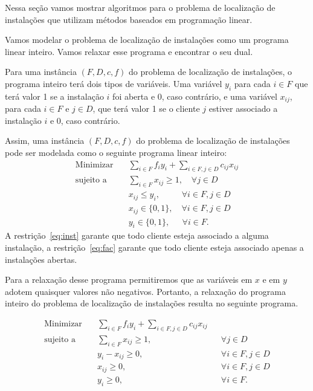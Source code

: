 Nessa seção vamos mostrar algoritmos para o problema de localização de instalações que utilizam métodos baseados em programação linear.

Vamos modelar o problema de localização de instalações como um programa linear inteiro. Vamos relaxar esse programa e encontrar o seu dual.

Para uma instância $(F,D,c,f)$ do problema de localização de instalações, o programa inteiro terá dois tipos de variáveis. Uma variável $y_i$ para cada $i \in F$ que terá valor 1 se a instalação $i$ foi aberta e 0, caso contrário, e uma variável $x_{ij}$, para cada $i \in F$ e $j \in D$, que terá valor 1 se o cliente $j$ estiver associado a instalação $i$ e 0, caso contrário. 

Assim, uma instância $(F,D,c,f)$ do problema de localização de instalações pode ser modelada como o seguinte programa linear inteiro:
\begin{align}
 \text{Minimizar} \quad & \sum_{i \in F}f_iy_i + \sum_{i\in F,j\in D}c_{ij}x_{ij} \nonumber \\
 \text{sujeito a} \quad & \sum_{i\in F} x_{ij}\geq1, \quad \forall j \in D \label{eq:inst}\\
 &x_{ij} \leq y_i,\quad \quad \; \; \forall i\in F,j\in D \label{eq:fac} \\
 &x_{ij} \in \{0,1\} ,\quad \forall i\in F,j\in D \label{fl:x}\\
 &y_i \in \{0,1\}, \quad \; \,\forall i\in F \label{fl:y}.
\end{align}
A restrição~\eqref{eq:inst} garante que todo cliente esteja associado a alguma instalação, a restrição~\eqref{eq:fac} garante que todo cliente esteja associado apenas a instalações abertas.

Para a relaxação desse programa permitiremos que as variáveis em $x$ e em $y$ adotem quaisquer valores não negativos. Portanto, a relaxação do programa inteiro do problema de localização de instalações resulta no seguinte programa.

    \begin{align}
        \text{Minimizar} \quad & \sum_{i \in F}f_iy_i + \sum_{i\in F,j\in D}c_{ij}x_{ij} \tag{PL} \label{P1}\\
        \text{sujeito a} \quad & \sum_{i\in F} x_{ij}\geq1,  &&\forall j \in D \tag{P2} \label{P2}\\
        &y_i - x_{ij} \geq 0, &&\forall i\in F,j\in D \tag{P3} \label{P3}\\
        &x_{ij} \geq 0, &&\forall i\in F,j\in D\tag{P4}\label{P4}\\
        &y_i \geq 0, &&\forall i\in F. \tag{P5} \label{P5}
       \end{align}

